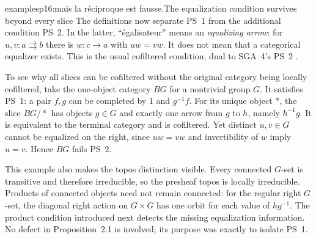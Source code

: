 \begin{dcomment}{examples}{p16:mais la réciproque est fausse.}{The equalization condition survives beyond every slice}
The definitions now separate PS~1 from the additional condition PS~2. In the latter, ``\'egalisateur'' means an \emph{equalizing arrow}: for $u,v:a\rightrightarrows b$ there is $w:c\to a$ with $uw=vw$. It does not mean that a categorical equalizer exists. This is the usual cofiltered condition, dual to SGA~4's PS~2 \citep[Expos\'e~I, \S2.7]{SGA4I1972}.

To see why all slices can be cofiltered without the original category being locally cofiltered, take the one-object category $BG$ for a nontrivial group $G$. It satisfies PS~1: a pair $f,g$ can be completed by $1$ and $g^{-1}f$. For its unique object $*$, the slice $BG/*$ has objects $g\in G$ and exactly one arrow from $g$ to $h$, namely $h^{-1}g$. It is equivalent to the terminal category and is cofiltered. Yet distinct $u,v\in G$ cannot be equalized on the right, since $uw=vw$ and invertibility of $w$ imply $u=v$. Hence $BG$ fails PS~2.

This example also makes the topos distinction visible. Every connected $G$-set is transitive and therefore irreducible, so the presheaf topos is locally irreducible. Products of connected objects need not remain connected: for the regular right $G$-set, the diagonal right action on $G\times G$ has one orbit for each value of $hg^{-1}$. The product condition introduced next detects the missing equalization information. No defect in Proposition~2.1 is involved; its purpose was exactly to isolate PS~1.
\end{dcomment}



